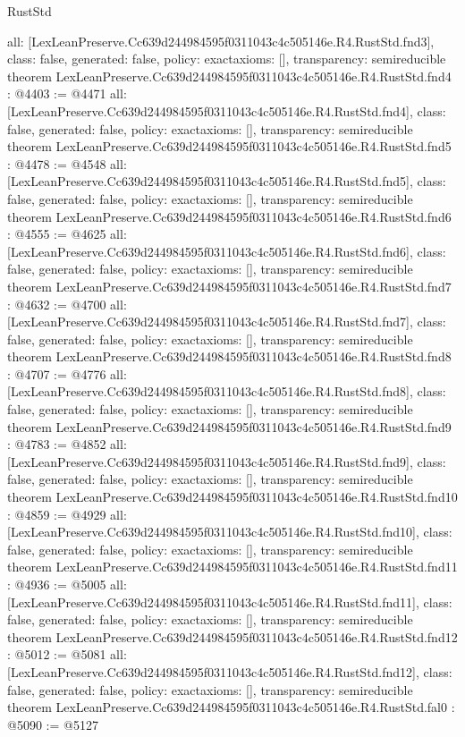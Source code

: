 \begin{lexlean}{RustStd}
\begin{coremodule}
{  all: [LexLeanPreserve.Cc639d244984595f0311043c4c505146e.R4.RustStd.fnd3],
  class: false,
  generated: false,
  policy: exact{axioms: []},
  transparency: semireducible
}
theorem LexLeanPreserve.Cc639d244984595f0311043c4c505146e.R4.RustStd.fnd4 : @4403 := @4471 {
  all: [LexLeanPreserve.Cc639d244984595f0311043c4c505146e.R4.RustStd.fnd4],
  class: false,
  generated: false,
  policy: exact{axioms: []},
  transparency: semireducible
}
theorem LexLeanPreserve.Cc639d244984595f0311043c4c505146e.R4.RustStd.fnd5 : @4478 := @4548 {
  all: [LexLeanPreserve.Cc639d244984595f0311043c4c505146e.R4.RustStd.fnd5],
  class: false,
  generated: false,
  policy: exact{axioms: []},
  transparency: semireducible
}
theorem LexLeanPreserve.Cc639d244984595f0311043c4c505146e.R4.RustStd.fnd6 : @4555 := @4625 {
  all: [LexLeanPreserve.Cc639d244984595f0311043c4c505146e.R4.RustStd.fnd6],
  class: false,
  generated: false,
  policy: exact{axioms: []},
  transparency: semireducible
}
theorem LexLeanPreserve.Cc639d244984595f0311043c4c505146e.R4.RustStd.fnd7 : @4632 := @4700 {
  all: [LexLeanPreserve.Cc639d244984595f0311043c4c505146e.R4.RustStd.fnd7],
  class: false,
  generated: false,
  policy: exact{axioms: []},
  transparency: semireducible
}
theorem LexLeanPreserve.Cc639d244984595f0311043c4c505146e.R4.RustStd.fnd8 : @4707 := @4776 {
  all: [LexLeanPreserve.Cc639d244984595f0311043c4c505146e.R4.RustStd.fnd8],
  class: false,
  generated: false,
  policy: exact{axioms: []},
  transparency: semireducible
}
theorem LexLeanPreserve.Cc639d244984595f0311043c4c505146e.R4.RustStd.fnd9 : @4783 := @4852 {
  all: [LexLeanPreserve.Cc639d244984595f0311043c4c505146e.R4.RustStd.fnd9],
  class: false,
  generated: false,
  policy: exact{axioms: []},
  transparency: semireducible
}
theorem LexLeanPreserve.Cc639d244984595f0311043c4c505146e.R4.RustStd.fnd10 : @4859 := @4929 {
  all: [LexLeanPreserve.Cc639d244984595f0311043c4c505146e.R4.RustStd.fnd10],
  class: false,
  generated: false,
  policy: exact{axioms: []},
  transparency: semireducible
}
theorem LexLeanPreserve.Cc639d244984595f0311043c4c505146e.R4.RustStd.fnd11 : @4936 := @5005 {
  all: [LexLeanPreserve.Cc639d244984595f0311043c4c505146e.R4.RustStd.fnd11],
  class: false,
  generated: false,
  policy: exact{axioms: []},
  transparency: semireducible
}
theorem LexLeanPreserve.Cc639d244984595f0311043c4c505146e.R4.RustStd.fnd12 : @5012 := @5081 {
  all: [LexLeanPreserve.Cc639d244984595f0311043c4c505146e.R4.RustStd.fnd12],
  class: false,
  generated: false,
  policy: exact{axioms: []},
  transparency: semireducible
}
theorem LexLeanPreserve.Cc639d244984595f0311043c4c505146e.R4.RustStd.fal0 : @5090 := @5127 {
}
\end{coremodule}
\end{lexlean}
